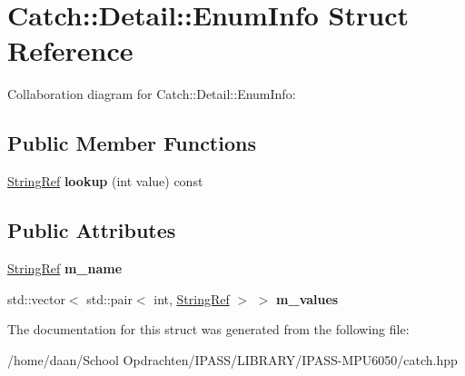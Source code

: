 \hypertarget{structCatch_1_1Detail_1_1EnumInfo}{}\section{Catch\+:\+:Detail\+:\+:Enum\+Info Struct Reference}
\label{structCatch_1_1Detail_1_1EnumInfo}


Collaboration diagram for Catch\+:\+:Detail\+:\+:Enum\+Info\+:
\subsection*{Public Member Functions}
\begin{DoxyCompactItemize}
\item 
\mbox{\label{structCatch_1_1Detail_1_1EnumInfo_a2fdfacc411d7afb1cb690366e5e49cb3}} 
\hyperlink{classCatch_1_1StringRef}{String\+Ref} {\bfseries lookup} (int value) const
\end{DoxyCompactItemize}
\subsection*{Public Attributes}
\begin{DoxyCompactItemize}
\item 
\mbox{\label{structCatch_1_1Detail_1_1EnumInfo_a16ecfd3a7e11439433aabbdf6ecb676c}} 
\hyperlink{classCatch_1_1StringRef}{String\+Ref} {\bfseries m\+\_\+name}
\item 
\mbox{\label{structCatch_1_1Detail_1_1EnumInfo_ad65c0537a50d375859295a2c18ade489}} 
std\+::vector$<$ std\+::pair$<$ int, \hyperlink{classCatch_1_1StringRef}{String\+Ref} $>$ $>$ {\bfseries m\+\_\+values}
\end{DoxyCompactItemize}


The documentation for this struct was generated from the following file\+:\begin{DoxyCompactItemize}
\item 
/home/daan/\+School Opdrachten/\+I\+P\+A\+S\+S/\+L\+I\+B\+R\+A\+R\+Y/\+I\+P\+A\+S\+S-\/\+M\+P\+U6050/catch.\+hpp\end{DoxyCompactItemize}
